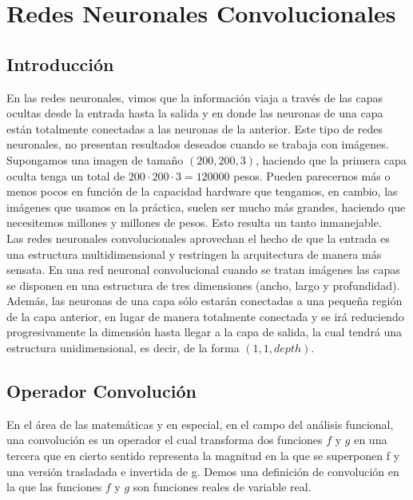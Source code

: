 \chapter{Redes Neuronales Convolucionales}\label{ch:CNN}

\newpage
\section{Introducción}

        En las redes neuronales, vimos que la información viaja a través de las capas ocultas desde la entrada hasta la salida y en donde las neuronas de una capa están totalmente conectadas a las neuronas de la anterior. Este tipo de redes neuronales, no presentan resultados deseados cuando se trabaja con imágenes. Supongamos una imagen de tamaño $(200,200,3)$, haciendo que la primera capa oculta tenga un total de $200 \cdot 200 \cdot 3 = 120000$ pesos. Pueden parecernos más o menos pocos en función de la capacidad hardware que tengamos, en cambio, las imágenes que usamos en la práctica, suelen ser mucho más grandes, haciendo que necesitemos millones y millones de pesos. Esto resulta un tanto inmanejable. \\
        
        Las redes neuronales convolucionales aprovechan el hecho de que la entrada es una estructura multidimensional y restringen la arquitectura de manera más sensata. En una red neuronal convolucional cuando se tratan imágenes las capas se disponen en una estructura de tres dimensiones (ancho, largo y profundidad). Además, las neuronas de una capa sólo estarán conectadas a una pequeña región de la capa anterior, en lugar de manera totalmente conectada y se irá reduciendo progresivamente la dimensión hasta llegar a la capa de salida, la cual tendrá una estructura unidimensional, es decir, de la forma $(1,1,depth)$. \\
        
        
\section{Operador Convolución}

    En el área de las matemáticas y en especial, en el campo del análisis funcional, una convolución es un operador el cual transforma dos funciones $f$ y $g$ en una tercera que en cierto sentido representa la magnitud en la que se superponen f y una versión trasladada e invertida de g. Demos una definición de convolución en la que las funciones $f$ y $g$ son funciones reales de variable real.
    
